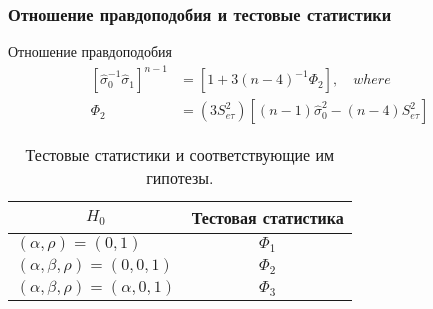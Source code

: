 \documentclass{beamer}
\begin{document}
\begin{frame}
\frametitle{Отношение правдоподобия и тестовые статистики}
Отношение правдоподобия 
\begin{align}
\left[\hat{\sigma}_0^{-1}\hat{\sigma}_1\right]^{n-1}&=\left[1+3(n-4)^{-1}\Phi_2\right],\quad where\\
\Phi_2&=(3S^2_{e\tau})\left[(n-1)\hat{\sigma}_0^2-(n-4)S^2_{e\tau}\right]
\end{align}

\begin{table}
	\centering
	\caption{Тестовые статистики и соответствующие им гипотезы.}
	\begin{tabular}{|l|c|}
		\hline
		\multicolumn{1}{|c|}{$H_0$} & Тестовая статистика \\ \hline
		$(\alpha,\rho)=(0,1)$ & $\Phi_1$ \\ \hline
		$(\alpha,\beta,\rho)=(0,0,1)$ & $\Phi_2$ \\ \hline
		$(\alpha,\beta,\rho)=(\alpha,0,1)$ & $\Phi_3$ \\ \hline
	\end{tabular}
\end{table}
\end{frame}
\end{document}
